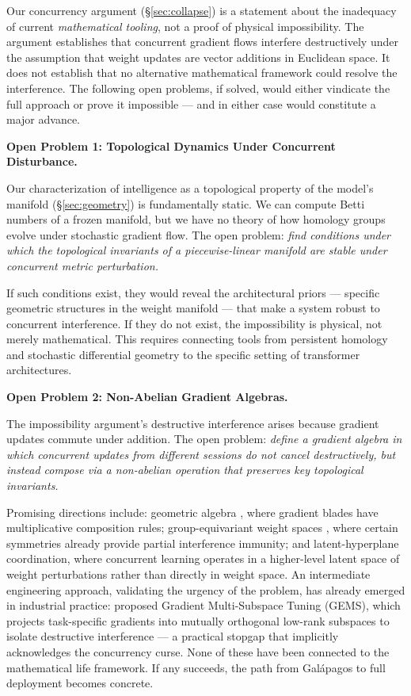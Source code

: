 \documentclass{article}
\begin{document}
Our concurrency argument (\S\ref{sec:collapse}) is a statement about the inadequacy of current \emph{mathematical tooling}, not a proof of physical impossibility. The argument establishes that concurrent gradient flows interfere destructively under the assumption that weight updates are vector additions in Euclidean space. It does not establish that no alternative mathematical framework could resolve the interference. The following open problems, if solved, would either vindicate the full approach or prove it impossible --- and in either case would constitute a major advance.

\bigskip
\noindent\textbf{Open Problem 1: Topological Dynamics Under Concurrent Disturbance.}

Our characterization of intelligence as a topological property of the model's manifold (\S\ref{sec:geometry}) is fundamentally static. We can compute Betti numbers of a frozen manifold, but we have no theory of how homology groups evolve under stochastic gradient flow. The open problem: \emph{find conditions under which the topological invariants of a piecewise-linear manifold are stable under concurrent metric perturbation.}

If such conditions exist, they would reveal the architectural priors --- specific geometric structures in the weight manifold --- that make a system robust to concurrent interference. If they do not exist, the impossibility is physical, not merely mathematical. This requires connecting tools from persistent homology \citep{Carlsson2009topology} and stochastic differential geometry to the specific setting of transformer architectures.

\bigskip
\noindent\textbf{Open Problem 2: Non-Abelian Gradient Algebras.}

The impossibility argument's destructive interference arises because gradient updates commute under addition. The open problem: \emph{define a gradient algebra in which concurrent updates from different sessions do not cancel destructively, but instead compose via a non-abelian operation that preserves key topological invariants.}

Promising directions include: geometric algebra \citep{Hestenes2012.Clifford}, where gradient blades have multiplicative composition rules; group-equivariant weight spaces \citep{Cohen2016equvariant}, where certain symmetries already provide partial interference immunity; and latent-hyperplane coordination, where concurrent learning operates in a higher-level latent space of weight perturbations rather than directly in weight space. An intermediate engineering approach, validating the urgency of the problem, has already emerged in industrial practice: \citet{Zhao2026GEMS} proposed Gradient Multi-Subspace Tuning (GEMS), which projects task-specific gradients into mutually orthogonal low-rank subspaces to isolate destructive interference — a practical stopgap that implicitly acknowledges the concurrency curse. None of these have been connected to the mathematical life framework. If any succeeds, the path from Galápagos to full deployment becomes concrete.
\end{document}
